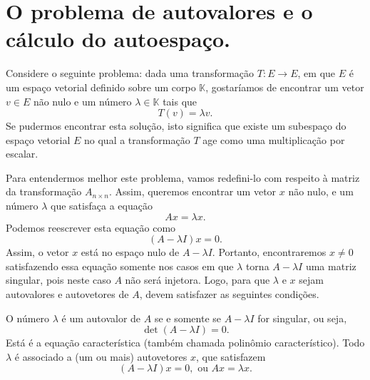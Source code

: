 
\section{O problema de autovalores e o cálculo do autoespaço.}

Considere o seguinte problema: dada uma transformação $T:E\to E$, em que $E$ é um espaço vetorial definido sobre um corpo ${\mathbb{K}}$, gostaríamos de encontrar um vetor $v\in E$ não nulo e um número $\lambda \in {\mathbb{K}}$ tais que
\begin{equation}\label{eq:invariantes}
	T(v)=\lambda v.
\end{equation}
Se pudermos encontrar esta solução, isto significa que existe um subespaço do espaço vetorial $E$ no qual a transformação $T$ age como uma multiplicação por escalar. 

Para entendermos melhor este problema, vamos redefini-lo com respeito à matriz da transformação $A_{n\times n}$. Assim, queremos encontrar um vetor $x$ não nulo, e um número $\lambda$ que satisfaça a equação
\begin{equation}\label{eq:autovalores}
	Ax=\lambda x.
\end{equation}
Podemos reescrever esta equação como 
\begin{equation*}
    (A-\lambda I)x = 0.
\end{equation*}
Assim, o vetor $x$ está no espaço nulo de $A-\lambda I$. Portanto, encontraremos $x\ne 0$ satisfazendo essa equação somente nos casos em que $\lambda$ torna $A-\lambda I$ uma matriz singular, pois neste caso $A$ não será injetora. Logo, para que $\lambda$ e $x$ sejam autovalores e autovetores de $A$, devem satisfazer as seguintes condições.

\begin{defi}
    O número $\lambda$ é um autovalor de $A$ se e somente se $A-\lambda I$ for singular, ou seja,
    \begin{equation*}
        \det(A-\lambda I) = 0.
    \end{equation*}
    Está é a equação característica (também chamada polinômio característico). Todo $\lambda$ é associado a (um ou mais) autovetores $x$, que satisfazem
    \begin{equation*}
        (A-\lambda I)x=0, \mbox{ ou } Ax=\lambda x.
    \end{equation*}
\end{defi}


